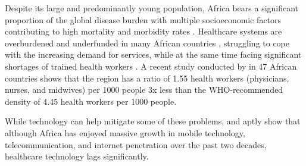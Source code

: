 \documentclass[11pt,a4paper]{article}
\begin{document}
Despite its large and predominantly young population, Africa bears a significant proportion of the global disease burden \cite{de2010tackling} with multiple socioeconomic factors contributing to high mortality and morbidity rates \cite{baingana2006changing}. Healthcare systems are overburdened and underfunded in many African countries \cite{oleribe2019identifying, naicker2009shortage,nkomazana2015stakeholders}, struggling to cope with the increasing demand for services, while at the same time facing significant shortages of trained health workers \cite{whoChronicStaff, ahmat2022health, naicker2010shortage, nkomazana2015stakeholders, kinfu2009health,etori2023we}. A recent study conducted by \citet{ahmat2022health} in 47 African countries shows that the region has a ratio of 1.55 health workers (physicians, nurses, and midwives) per 1000 people 3x less than the WHO-recommended density of 4.45 health workers per 1000 people. %

While technology can help mitigate some of these problems, \citet{bukachi2007information} and \citet{manyati2021systematic} aptly show that although Africa has enjoyed massive growth in mobile technology, telecommunication, and internet penetration over the past two decades, healthcare technology lags significantly. %
\end{document}

